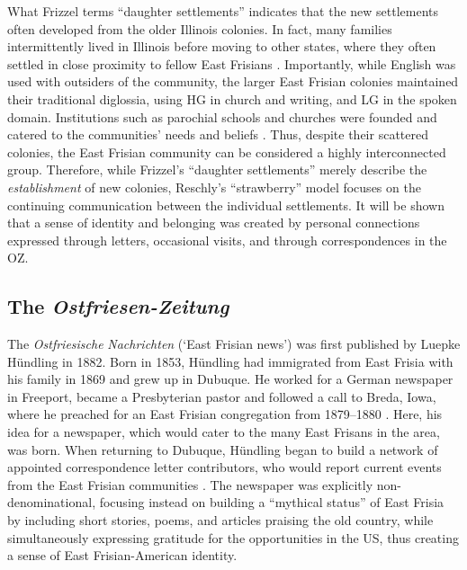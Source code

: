 \documentclass[output=paper]{langsci/langscibook}
\begin{document}
What Frizzel terms “daughter settlements” indicates that the new settlements often developed from the older Illinois colonies. In fact, many families intermittently lived in Illinois before moving to other states, where they often settled in close proximity to fellow East Frisians \citep{Schnucker1917}. Importantly, while English was used with outsiders of the community, the larger East Frisian colonies maintained their traditional diglossia, using HG in church and writing, and LG in the spoken domain. Institutions such as parochial schools and churches were founded and catered to the communities’ needs and beliefs \citep{Wirrer1995}. Thus, despite their scattered colonies, the East Frisian community can be considered a highly interconnected group. Therefore, while Frizzel’s “daughter settlements” merely describe the \textit{establishment} of new colonies, Reschly’s “strawberry” model focuses on the continuing communication between the individual settlements. It will be shown that a sense of identity and belonging was created by personal connections expressed through letters, occasional visits, and through correspondences in the OZ. 

\subsection{The \textit{Ostfriesen-Zeitung}} %
\label{sec:rocker:3.2}

The \textit{Ostfriesische} \textit{Nachrichten} (‘East Frisian news’) was first published by Luepke Hündling in 1882. Born in 1853, Hündling had immigrated from East Frisia with his family in 1869 and grew up in Dubuque. He worked for a German newspaper in Freeport, became a Presbyterian pastor and followed a call to Breda, Iowa, where he preached for an East Frisian congregation from 1879--1880 \citep{Lindaman2004}. Here, his idea for a newspaper, which would cater to the many East Frisans in the area, was born. When returning to Dubuque, Hündling began to build a network of appointed correspondence letter contributors, who would report current events from the East Frisian communities \citep[81]{Lindaman2004}. The newspaper was explicitly non-denominational, focusing instead on building a “mythical status” \citep[82]{Lindaman2004} of East Frisia by including short stories, poems, and articles praising the old country, while simultaneously expressing gratitude for the opportunities in the US, thus creating a sense of East Frisian-American identity. 
\end{document}
